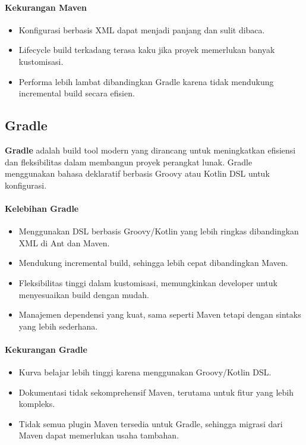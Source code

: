 \paragraph{Kekurangan Maven}
\begin{itemize}
	\item Konfigurasi berbasis XML dapat menjadi panjang dan sulit dibaca.
	\item Lifecycle build terkadang terasa kaku jika proyek memerlukan banyak kustomisasi.
	\item Performa lebih lambat dibandingkan Gradle karena tidak mendukung incremental build secara efisien.
\end{itemize}

\subsection{Gradle}
\textbf{Gradle} adalah build tool modern yang dirancang untuk meningkatkan efisiensi dan fleksibilitas dalam membangun proyek perangkat lunak. Gradle menggunakan bahasa deklaratif berbasis Groovy atau Kotlin DSL untuk konfigurasi.

\paragraph{Kelebihan Gradle}
\begin{itemize}
	\item Menggunakan DSL berbasis Groovy/Kotlin yang lebih ringkas dibandingkan XML di Ant dan Maven.
	\item Mendukung incremental build, sehingga lebih cepat dibandingkan Maven.
	\item Fleksibilitas tinggi dalam kustomisasi, memungkinkan developer untuk menyesuaikan build dengan mudah.
	\item Manajemen dependensi yang kuat, sama seperti Maven tetapi dengan sintaks yang lebih sederhana.
\end{itemize}

\paragraph{Kekurangan Gradle}
\begin{itemize}
	\item Kurva belajar lebih tinggi karena menggunakan Groovy/Kotlin DSL.
	\item Dokumentasi tidak sekomprehensif Maven, terutama untuk fitur yang lebih kompleks.
	\item Tidak semua plugin Maven tersedia untuk Gradle, sehingga migrasi dari Maven dapat memerlukan usaha tambahan.
\end{itemize}

